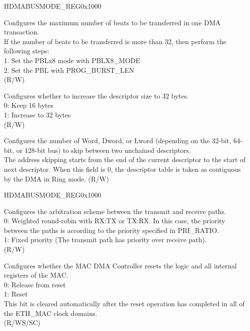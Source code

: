\begin{register}{H}{DMABUSMODE\_REG}{0x1000}
\begin{regdesc}
\begin{reglist}
Configures the maximum number of beats to be transferred in one DMA transaction.\\
If the number of beats to be transferred is more than 32, then perform the following steps: \\
1. Set the PBLx8 mode with PBLX8\_MODE\\
2. Set the PBL with PROG\_BURST\_LEN\\(R/W)
\item [ALT\_DESC\_SIZE] Configures whether to increase the descriptor size to 32 bytes.\\
0: Keep 16 bytes\\
1: Increase to 32 bytes\\(R/W)
\item [DESC\_SKIP\_LEN] Configures the number of Word, Dword, or Lword (depending on the 32-bit, 64-bit, or 128-bit bus) to skip between two unchained descriptors.\\The address skipping starts from the end of the current descriptor to the start of next descriptor. When this field is 0, the descriptor table is taken as contiguous by the DMA in Ring mode. (R/W)

\item [Continued on the next page...]
\end{reglist}\end{regdesc}
\end{register}

\addtocounter{Regfloat}{-1}
\begin{register}{H}{DMABUSMODE\_REG}{0x1000}
\begin{regdesc}\begin{reglist}
\item [Continued from the previous page...]

\item [DMA\_ARB\_SCH] Configures the arbitration scheme between the transmit and receive paths.\\
0: Weighted round-robin with RX:TX or TX:RX. In this case, the priority between the paths is according to the priority specified in PRI\_RATIO.\\
1: Fixed priority (The transmit path has priority over receive path).\\(R/W)
\item [SW\_RST] Configures whether the MAC DMA Controller resets the logic and all internal registers of the MAC.\\
0: Release from reset\\
1: Reset\\
This bit is cleared automatically after the reset operation has completed in all of the ETH\_MAC clock domains.\\ (R/WS/SC)
\end{reglist}\end{regdesc}
\end{register}


